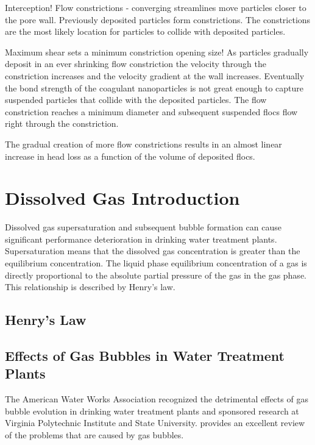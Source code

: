 \documentclass[letterpaper,10pt,english]{sphinxmanual}
\begin{document}
Interception!
Flow constrictions - converging streamlines move particles closer to the pore wall. Previously deposited particles form constrictions. The constrictions are the most likely location for particles to collide with deposited particles.

Maximum shear sets a minimum constriction opening size!
As particles gradually deposit in an ever shrinking flow constriction the velocity through the constriction increases and the velocity gradient at the wall increases. Eventually the bond strength of the coagulant nanoparticles is not great enough to capture suspended particles that collide with the deposited particles. The flow constriction reaches a minimum diameter and subsequent suspended flocs flow right through the constriction.

The gradual creation of more flow constrictions results in an almost linear increase in head loss as a function of the volume of deposited flocs.


\chapter{Dissolved Gas Introduction}
\label{\detokenize{Dissolved_Gas/DG_Intro:dissolved-gas-introduction}}\label{\detokenize{Dissolved_Gas/DG_Intro:title-dissolved-gas-introduction}}\label{\detokenize{Dissolved_Gas/DG_Intro::doc}}
Dissolved gas supersaturation and subsequent bubble formation can cause significant performance deterioration in drinking water treatment plants. Supersaturation means that the dissolved gas concentration is greater than the equilibrium concentration. The liquid phase equilibrium concentration of a gas is directly proportional to the absolute partial pressure of the gas in the gas phase. This relationship is described by Henry’s law.


\section{Henry’s Law}
\label{\detokenize{Dissolved_Gas/DG_Intro:henry-s-law}}\label{\detokenize{Dissolved_Gas/DG_Intro:heading-henrys-law}}

\section{Effects of Gas Bubbles in Water Treatment Plants}
\label{\detokenize{Dissolved_Gas/DG_Intro:effects-of-gas-bubbles-in-water-treatment-plants}}\label{\detokenize{Dissolved_Gas/DG_Intro:heading-effects-of-gas-bubbles-in-water-treatment-plants}}
The American Water Works Association recognized the detrimental effects of gas bubble evolution in drinking water treatment plants and sponsored research at Virginia Polytechnic Institute and State University.  provides an excellent review of the problems that are caused by gas bubbles.
\end{document}
